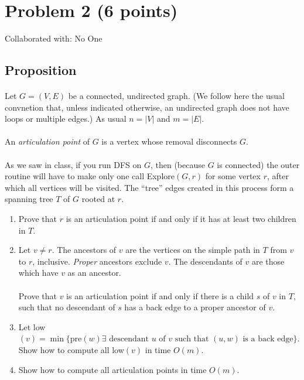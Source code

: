 \documentclass{article}
\begin{document}
\section{Problem 2 (6 points)}
Collaborated with: No One

\subsection{Proposition}
\paragraph{}
Let \(G=(V,E)\) be a connected, undirected graph. (We follow here the usual convnetion
that, unless indicated otherwise, an undirected graph does not have loops or multiple
edges.) As usual \(n=|V|\) and \(m=|E|\).

\paragraph{}
An \textit{articulation point} of \(G\) is a vertex whose removal disconnects \(G\).

\paragraph{}
As we saw in class, if you run DFS on \(G\), then (because \(G\) is connected) the outer
routine will have to make only one call Explore\((G,r)\) for some vertex \(r\), after
which all vertices will be visited. The ``tree'' edges created in this process form a
spanning tree \(T\) of \(G\) rooted at \(r\).

\begin{enumerate}[label= (\alph*)]
      \item Prove that \(r\) is an articulation point if and only if it has at least two
            children in \(T\).
      \item Let \(v \neq r\). The ancestors of \(v\) are the vertices on the simple path
            in \(T\) from \(v\) to \(r\), inclusive. \textit{Proper} ancestors exclude \(v\).
            The descendants of \(v\) are those which have \(v\) as an ancestor.
            \paragraph{}
            Prove that \(v\) is an articulation point if and only if there is a child \(s\) of
            \(v\) in \(T\), such that no descendant of \(s\) has a back edge to a proper
            ancestor of \(v\).
      \item Let low\((v) = \min \{ \text{pre}(w)  \exists \text{ descendant } u \text{ of } v
            \text{ such that } (u,w) \text{ is a back edge}\} \). Show how to compute all
            low\((v)\) in time \(O(m)\).
      \item Show how to compute all articulation points in time \(O(m)\).

\end{enumerate}
\end{document}
